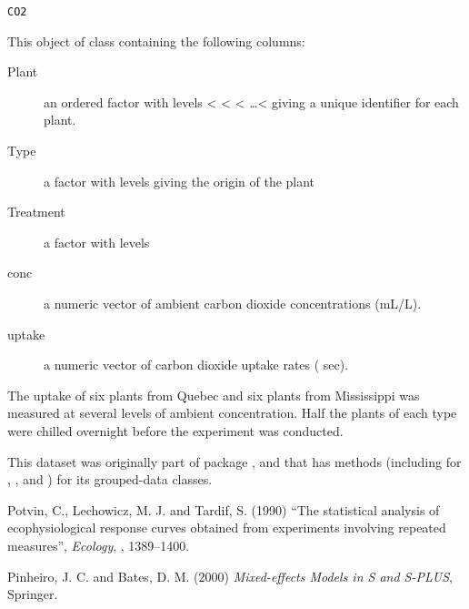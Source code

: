 %
\begin{Usage}
\begin{verbatim}
CO2
\end{verbatim}
\end{Usage}
%
\begin{Format}
This object of class  containing the following columns:
\begin{description}

\item[Plant] 
an ordered factor with levels
 <  <  < \dots < 
giving a unique identifier for each plant.

\item[Type] 
a factor with levels
giving the origin of the plant

\item[Treatment] 
a factor with levels

\item[conc] 
a numeric vector of ambient carbon dioxide concentrations (mL/L).

\item[uptake] 
a numeric vector of carbon dioxide uptake rates
( sec).


\end{description}

\end{Format}
%
\begin{Details}\relax
The  uptake of six plants from Quebec and six plants
from Mississippi was measured at several levels of ambient
 concentration.  Half the plants of each type were
chilled overnight before the experiment was conducted.

This dataset was originally part of package , and that has
methods (including for \code{[}, ,  and
) for its grouped-data classes. 
\end{Details}
%
\begin{Source}\relax
Potvin, C., Lechowicz, M. J. and Tardif, S. (1990)
``The statistical analysis of ecophysiological response curves
obtained from experiments involving repeated measures'', \emph{Ecology},
, 1389--1400.

Pinheiro, J. C. and Bates, D. M. (2000)
\emph{Mixed-effects Models in S and S-PLUS}, Springer.
\end{Source}
